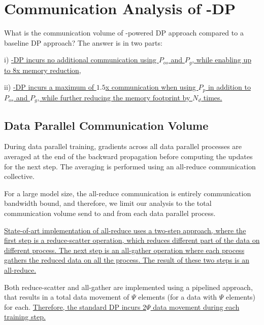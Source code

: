 \section{Communication Analysis of \name-DP}\label{sec:communication}

What is the communication volume of \name-powered DP approach compared to a baseline DP approach?
The answer is in two parts:

i) \uline{\name-DP incurs no additional communication using $P_{os}$ and $P_g$, while enabling up to 8x memory reduction},

ii) \uline{\name-DP incurs a maximum of $1.5$x communication when using $P_p$ in addition to $P_{os}$ and $P_{g}$, while further reducing the memory footprint by $N_d$ times.}

\subsection{Data Parallel Communication Volume}

During data parallel training, gradients across all data parallel processes are averaged at the end of the backward propagation before computing the updates for the next step. The averaging is performed using an all-reduce communication collective.

For a large model size, the all-reduce communication is entirely communication bandwidth bound, and therefore, we limit our analysis to the total communication volume send to and from each data parallel process.

\uline{State-of-art implementation of all-reduce uses a two-step approach, where the first step is a reduce-scatter operation, which reduces different part of the data on different process. The next step is an all-gather operation where each process gathers the reduced data on all the process. The result of these two steps is an all-reduce.}

Both reduce-scatter and all-gather are implemented using a pipelined approach, that results in a total data movement of $\Psi$ elements (for a data with $\Psi$ elements) for each. \uline{Therefore, the standard DP incurs 2$\Psi$ data movement during each training step.}

